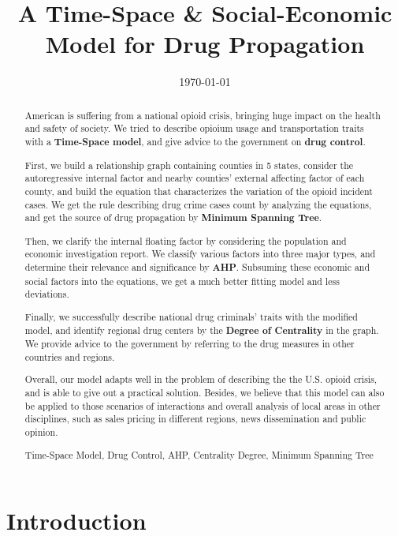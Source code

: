 \documentclass{mcmthesis}
\title{A Time-Space \& Social-Economic Model for Drug Propagation}
\author{}
\date{\today}
\begin{document}
\begin{abstract}
	American is suffering from a national opioid crisis, bringing huge impact on the health and safety of society. We tried to  describe opioium usage and transportation traits with a \textbf{Time-Space model}, and give advice to the government on \textbf{drug control}.
	
	First, we build a relationship graph containing counties in 5 states, consider the autoregressive internal factor and nearby counties' external affecting factor of each county, and build the equation that characterizes the variation of the opioid incident cases. We get the rule describing drug crime cases count by analyzing the equations, and get the source of drug propagation by \textbf{Minimum Spanning Tree}.
	
	Then, we clarify the internal floating factor by considering the population and economic investigation report. We classify various factors into three major types, and determine their relevance and significance by \textbf{AHP}. Subsuming these economic and social factors into the equations, we get a much better fitting model and less deviations.
	
	Finally, we successfully describe national drug criminals’ traits with the modified model, and identify regional drug centers by the \textbf{Degree of Centrality} in the graph. We provide advice to the government by referring to the drug measures in other countries and regions.
	
	Overall, our model adapts well in the problem of describing the the U.S. opioid crisis, and is able to give out a practical solution. Besides, we believe that this model can also be applied to those scenarios of interactions and overall analysis of local areas in other disciplines, such as sales pricing in different regions, news dissemination and public opinion.
	\begin{keywords}
		 Time-Space Model, Drug Control, AHP, Centrality Degree, Minimum Spanning Tree
	\end{keywords}
\end{abstract}
\maketitle
\pagestyle{empty}
\tableofcontents

\newpage
\pagestyle{fancy}
\setcounter{page}{1}
\section{Introduction}
\end{document}
